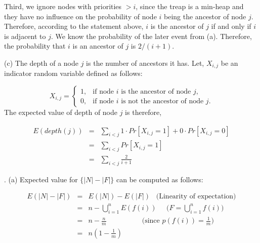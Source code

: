 \documentclass[assign]{article}
\begin{document}
\par Third, we ignore nodes with priorities $ > i$, since the treap is a min-heap and they have no influence on the probability of node $i$ being the ancestor of node $j$. Therefore, according to the statement above, $i$ is the ancestor of $j$ if and only if $i$ is adjacent to $j$. We know the probability of the later event from (a). Therefore, the probability that $i$ is an ancestor of $j$ is $2/(i+1)$.

\par (c) The depth of a node $j$ is the number of ancestors it has. Let, $X_{i,j}$ be an indicator random variable defined as follows: 

\vspace{-10pt}
\begin{equation*}
    X_{i,j} = 
         \begin{cases}
              1, & \mbox{if node $i$ is the ancestor of node $j$}, \\
	     0, & \mbox{if node $i$ is not the ancestor of node $j$}.
          \end{cases}
\end{equation*}
\vspace{-5pt}
The expected value of depth of node $j$ is therefore,

\vspace{-10pt}
\begin{eqnarray*}
         E(depth(j)) &=& \sum_{i < j} 1 \cdot Pr[X_{i,j} = 1] + 0 \cdot Pr[X_{i,j} = 0] \\
                               &=& \sum_{i<j} Pr[X_{i,j} = 1] \\
                               &=& \sum_{i<j} \frac{2}{i+1}
\end{eqnarray*}
\vspace{-10pt}

\par {}. (a)
  Expected value for $\{|N| - |F|\}$ can be computed as follows:

\begin{eqnarray*}
  E(|N|-|F|) &=& E(|N|) - E(|F|)  \; \; \; \mbox{(Linearity of expectation)} \\
 &=& n - \bigcup_{i=1}^{n} E(f(i)) \; \; \; \; \;  \mbox{($F = \bigcup_{i=1}^{n} f(i)$)}\\
  &=& n - \frac{n}{m} \; \; \; \; \; \; \; \; \; \; \; \; \; \; \; \; \; \;\mbox{(since $p(f(i)) = \frac{1}{m}$) } \\
  &=& n(1 - \frac{1}{m}) \\
\end{eqnarray*}
\end{document}
